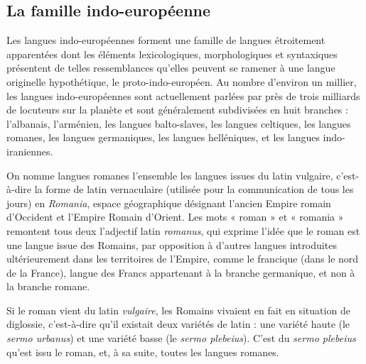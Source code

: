 \subsection{La famille indo-européenne}
Les langues indo-européennes forment une famille de langues étroitement apparentées dont les éléments lexicologiques, morphologiques et syntaxiques présentent de telles ressemblances qu’elles peuvent se ramener à une langue originelle hypothétique, le proto-indo-européen. Au nombre d’environ un millier, les langues indo-européennes sont actuellement parlées par près de trois milliards de locuteurs sur la planète et sont généralement subdivisées en huit branches : l’albanais, l’arménien, les langues balto-slaves, les langues celtiques, les langues romanes, les langues germaniques, les langues helléniques, et les langues indo-iraniennes.

On nomme langues romanes l’ensemble les langues issues du latin vulgaire, c’est-à-dire la forme de latin vernaculaire (utilisée pour la communication de tous les jours) en \textit{Romania}, espace géographique désignant l’ancien Empire romain d’Occident et l’Empire Romain d’Orient. Les mots « roman » et « romania » remontent tous deux l’adjectif latin \textit{romanus}, qui exprime l’idée que le roman est une langue issue des Romains, par opposition à d’autres langues introduites ultérieurement dans les territoires de l’Empire, comme le francique (dans le nord de la France), langue des Francs appartenant à la branche germanique, et non à la branche romane.

Si le roman vient du latin \textit{vulgaire}, les Romains vivaient en fait en situation de diglossie, c’est-à-dire qu’il existait deux variétés de latin : une variété haute (le \textit{sermo urbanus}) et une variété basse (le \textit{sermo plebeius}). C’est du \textit{sermo plebeius} qu’est issu le roman, et, à sa suite, toutes les langues romanes.

